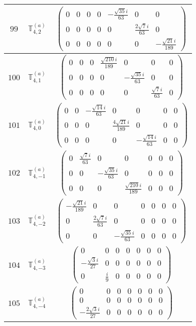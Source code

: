 \documentclass[fleqn,8pt,landscape]{jsarticle}
\begin{document}
\begin{center}
\begin{longtable}{ccc}
$ 99 $ & $ \mathbb{T}_{4,2}^{(a)} $ & $ \begin{pmatrix} 0 & 0 & 0 & 0 & - \frac{\sqrt{35} i}{63} & 0 & 0 \\ 0 & 0 & 0 & 0 & 0 & \frac{2 \sqrt{7} i}{63} & 0 \\ 0 & 0 & 0 & 0 & 0 & 0 & - \frac{\sqrt{21} i}{189} \end{pmatrix} $ \\ \hline
$ 100 $ & $ \mathbb{T}_{4,1}^{(a)} $ & $ \begin{pmatrix} 0 & 0 & 0 & \frac{\sqrt{210} i}{189} & 0 & 0 & 0 \\ 0 & 0 & 0 & 0 & - \frac{\sqrt{35} i}{63} & 0 & 0 \\ 0 & 0 & 0 & 0 & 0 & \frac{\sqrt{7} i}{63} & 0 \end{pmatrix} $ \\ \hline
$ 101 $ & $ \mathbb{T}_{4,0}^{(a)} $ & $ \begin{pmatrix} 0 & 0 & - \frac{\sqrt{14} i}{63} & 0 & 0 & 0 & 0 \\ 0 & 0 & 0 & \frac{4 \sqrt{21} i}{189} & 0 & 0 & 0 \\ 0 & 0 & 0 & 0 & - \frac{\sqrt{14} i}{63} & 0 & 0 \end{pmatrix} $ \\ \hline
$ 102 $ & $ \mathbb{T}_{4,-1}^{(a)} $ & $ \begin{pmatrix} 0 & \frac{\sqrt{7} i}{63} & 0 & 0 & 0 & 0 & 0 \\ 0 & 0 & - \frac{\sqrt{35} i}{63} & 0 & 0 & 0 & 0 \\ 0 & 0 & 0 & \frac{\sqrt{210} i}{189} & 0 & 0 & 0 \end{pmatrix} $ \\ \hline
$ 103 $ & $ \mathbb{T}_{4,-2}^{(a)} $ & $ \begin{pmatrix} - \frac{\sqrt{21} i}{189} & 0 & 0 & 0 & 0 & 0 & 0 \\ 0 & \frac{2 \sqrt{7} i}{63} & 0 & 0 & 0 & 0 & 0 \\ 0 & 0 & - \frac{\sqrt{35} i}{63} & 0 & 0 & 0 & 0 \end{pmatrix} $ \\ \hline
$ 104 $ & $ \mathbb{T}_{4,-3}^{(a)} $ & $ \begin{pmatrix} 0 & 0 & 0 & 0 & 0 & 0 & 0 \\ - \frac{\sqrt{3} i}{27} & 0 & 0 & 0 & 0 & 0 & 0 \\ 0 & \frac{i}{9} & 0 & 0 & 0 & 0 & 0 \end{pmatrix} $ \\ \hline
$ 105 $ & $ \mathbb{T}_{4,-4}^{(a)} $ & $ \begin{pmatrix} 0 & 0 & 0 & 0 & 0 & 0 & 0 \\ 0 & 0 & 0 & 0 & 0 & 0 & 0 \\ - \frac{2 \sqrt{3} i}{27} & 0 & 0 & 0 & 0 & 0 & 0 \end{pmatrix} $ \\ \hline

\end{longtable}
\end{center}
\end{document}
